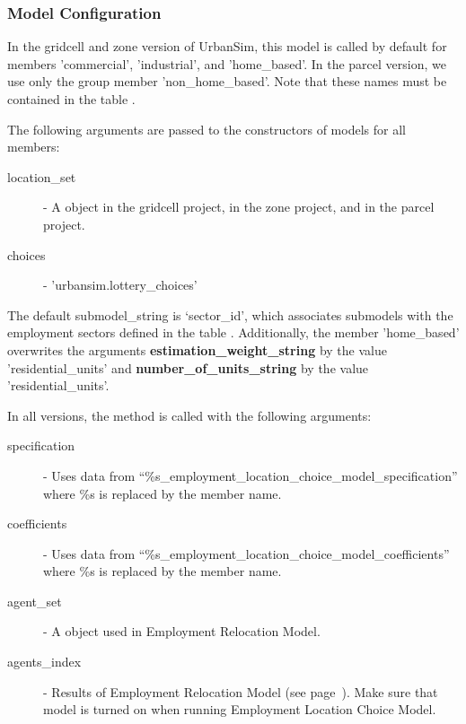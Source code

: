 \subsubsection{Model Configuration}
%
In the gridcell and zone version of UrbanSim, this model is called by default for members 'commercial', 
'industrial', and 'home_based'.
In the parcel version, we use only the group member 'non_home_based'. Note that 
these names must be contained in the table . 

The following arguments are passed to the constructors of models for all members:
\begin{description}
\item[location_set] - A  object in the gridcell project,  in the zone project,
  and  in the parcel project.
\item[choices] - 'urbansim.lottery_choices'
\end{description}
The default submodel_string is `sector_id', which associates submodels with the employment sectors defined in the table .  
Additionally, the member 'home_based' overwrites the arguments {\bf estimation_weight_string} by the value 'residential_units' 
and {\bf number_of_units_string} by the value 'residential_units'.

In all versions, the  method is called with the following arguments:
\begin{description}
\item[specification] - Uses data from
  ``\%s_employment_location_choice_model_specification'' where \%s is replaced by the member name.
\item[coefficients] - Uses data from ``\%s_employment_location_choice_model_coefficients'' 
    where \%s is replaced by the member name.
\item[agent_set] - A  object used in Employment Relocation Model.
\item[agents_index] - Results of Employment Relocation Model (see page~\pageref{page:ERM}). 
Make sure that model is turned on 
when running Employment Location Choice Model.
\end{description}
 
%
